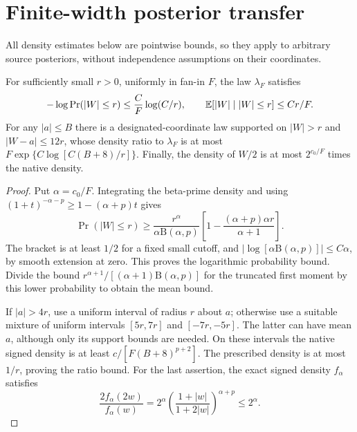 \section{Finite-width posterior transfer}
\label{sec:transfer}
All density estimates below are pointwise bounds, so they apply to arbitrary source posteriors, without independence assumptions on their coordinates.

\begin{lemma}
\label{lem:scalar}
For sufficiently small $r>0$, uniformly in fan-in $F$, the law $\lambda_F$ satisfies
\[
 -\log\Pr(|W|\le r)\le\frac C F\log(C/r),\qquad
 \mathbb E[|W|\mid |W|\le r]\le Cr/F.
\]
For any $|a|\le B$ there is a designated-coordinate law supported on $|W|>r$ and $|W-a|\le12r$, whose density ratio to $\lambda_F$ is at most
$F\exp\{C\log[C(B+8)/r]\}$.
Finally, the density of $W/2$ is at most $2^{c_0/F}$ times the native density.
\end{lemma}
\begin{proof}
Put $\alpha=c_0/F$. Integrating the beta-prime density and using
$(1+t)^{-\alpha-p}\ge1-(\alpha+p)t$ gives
\[
 \Pr(|W|\le r)\ge\frac{r^\alpha}{\alpha\mathrm B(\alpha,p)}
 \left[1-\frac{(\alpha+p)\alpha r}{\alpha+1}\right].
\]
The bracket is at least $1/2$ for a fixed small cutoff, and
$|\log[\alpha\mathrm B(\alpha,p)]|\le C\alpha$, by smooth extension at zero. This proves the logarithmic probability bound. Divide the bound $r^{\alpha+1}/[(\alpha+1)\mathrm B(\alpha,p)]$ for the truncated first moment by this lower probability to obtain the mean bound.

If $|a|>4r$, use a uniform interval of radius $r$ about $a$; otherwise use a suitable mixture of uniform intervals $[5r,7r]$ and $[-7r,-5r]$. The latter can have mean $a$, although only its support bounds are needed. On these intervals the native signed density is at least $c/[F(B+8)^{p+2}]$. The prescribed density is at most $1/r$, proving the ratio bound. For the last assertion, the exact signed density $f_\alpha$ satisfies
\[
 \frac{2f_\alpha(2w)}{f_\alpha(w)}
 =2^\alpha\left(\frac{1+|w|}{1+2|w|}\right)^{\alpha+p}
 \le2^\alpha.
\]
\end{proof}

